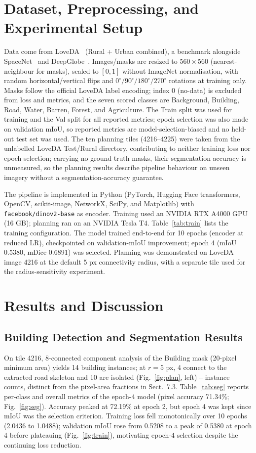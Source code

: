 \documentclass[runningheads]{llncs}
\begin{document}
\section{Dataset, Preprocessing, and Experimental Setup}\label{sec:setup}
Data come from LoveDA~\cite{wang2021loveda} (Rural + Urban combined), a benchmark alongside SpaceNet~\cite{vanetten2018} and DeepGlobe~\cite{demir2018}. Images/masks are resized to $560\times560$ (nearest-neighbour for masks), scaled to $[0,1]$ without ImageNet normalisation, with random horizontal/vertical flips and $0^\circ/90^\circ/180^\circ/270^\circ$ rotations at training only. Masks follow the official LoveDA label encoding; index 0 (no-data) is excluded from loss and metrics, and the seven scored classes are Background, Building, Road, Water, Barren, Forest, and Agriculture. The Train split was used for training and the Val split for all reported metrics; epoch selection was also made on validation mIoU, so reported metrics are model-selection-biased and no held-out test set was used. The ten planning tiles (4216--4225) were taken from the unlabelled LoveDA Test/Rural directory, contributing to neither training loss nor epoch selection; carrying no ground-truth masks, their segmentation accuracy is unmeasured, so the planning results describe pipeline behaviour on unseen imagery without a segmentation-accuracy guarantee.

The pipeline is implemented in Python (PyTorch, Hugging Face transformers, OpenCV, scikit-image, NetworkX, SciPy, and Matplotlib) with \texttt{facebook/dinov2-base} as encoder. Training used an NVIDIA RTX A4000 GPU (16 GB); planning ran on an NVIDIA Tesla T4. Table~\ref{tab:train} lists the training configuration. The model trained end-to-end for 10 epochs (encoder at reduced LR), checkpointed on validation-mIoU improvement; epoch 4 (mIoU 0.5380, mDice 0.6891) was selected. Planning was demonstrated on LoveDA image 4216 at the default 5 px connectivity radius, with a separate tile used for the radius-sensitivity experiment.

\section{Results and Discussion}
\subsection{Building Detection and Segmentation Results}
On tile 4216, 8-connected component analysis of the Building mask (20-pixel minimum area) yields 14 building instances; at $r=5$ px, 4 connect to the extracted road skeleton and 10 are isolated (Fig.~\ref{fig:plan}, left) -- instance counts, distinct from the pixel-area fractions in Sect.~7.3. Table~\ref{tab:seg} reports per-class and overall metrics of the epoch-4 model (pixel accuracy 71.34\%; Fig.~\ref{fig:seg}). Accuracy peaked at 72.19\% at epoch 2, but epoch 4 was kept since mIoU was the selection criterion. Training loss fell monotonically over 10 epochs (2.0436 to 1.0488); validation mIoU rose from 0.5208 to a peak of 0.5380 at epoch 4 before plateauing (Fig.~\ref{fig:train}), motivating epoch-4 selection despite the continuing loss reduction.
\end{document}
